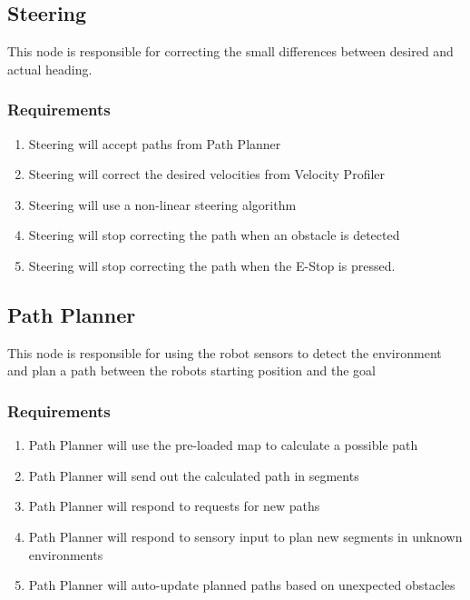   \subsection{Steering}
  This node is responsible for correcting the small differences
  between desired and actual heading.
  
  \subsubsection{Requirements}

  \begin{enumerate}
  \item Steering will accept paths from Path Planner
    \item Steering will correct the desired velocities from Velocity
      Profiler
    \item Steering will use a non-linear steering algorithm
      \item Steering will stop correcting the path when an obstacle is
detected
\item Steering will stop correcting the path when the E-Stop is pressed.
    \end{enumerate}

  \subsection{Path Planner}
  This node is responsible for using the robot sensors to detect the
  environment and plan a path between the robots starting position and
  the goal

  \subsubsection{Requirements}

  \begin{enumerate}
\item Path Planner will use the pre-loaded map to calculate a possible
  path
\item Path Planner will send out the calculated path in segments
\item Path Planner will respond to requests for new paths
  \item Path Planner will respond to sensory input to plan new
    segments in unknown environments
    \item Path Planner will auto-update planned paths based on
      unexpected obstacles
    \end{enumerate}
  
